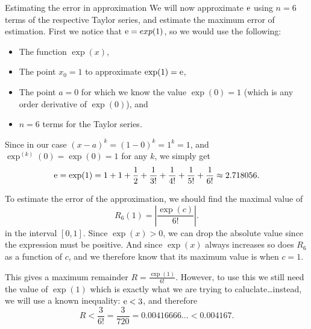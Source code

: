 \begin{example}{Estimating the error in approximation}{}
  We will now approximate $\mathrm{e}$ using $n=6$ terms of the respective Taylor series, and estimate the maximum error of estimation. First we notice that $\mathrm{e}=exp(1)$, so we would use the following:
  \begin{itemize}
    \item The function $\exp(x)$,
    \item The point $x_{0}=1$ to approximate $\exp(1)=\mathrm{e}$,
    \item The point $a=0$ for which we know the value $\exp(0)=1$ (which is any order derivative of $\exp(0)$), and
    \item $n=6$ terms for the Taylor series.
  \end{itemize}
  Since in our case $(x-a)^{k}=(1-0)^{k}=1^{k}=1$, and $\exp^{(k)}(0)=\exp(0)=1$ for any $k$, we simply get
  \[
    \mathrm{e} = \exp(1) = 1 + 1 + \frac{1}{2} + \frac{1}{3!} + \frac{1}{4!} + \frac{1}{5!} + \frac{1}{6!} \approx 2.718056.
  \]

  To estimate the error of the approximation, we should find the maximal value of
  \[
    R_{6}(1) = \left| \frac{\exp(c)}{6!} \right|.
  \]
  in the interval $[0,1]$. Since $\exp(x)>0$, we can drop the absolute value since the expression must be positive. And since $\exp(x)$ always increases so does $R_{6}$ as a function of $c$, and we therefore know that its maximum value is when $c=1$.

  This gives a maximum remainder $R = \frac{\exp(1)}{6!}$. However, to use this we still need the value of $\exp(1)$ which is exactly what we are trying to caluclate\dots instead, we will use a known inequality: $\mathrm{e}<3$, and therefore
  \[
    R<\frac{3}{6!}=\frac{3}{720}=0.00416666\dots<0.004167.
  \]
\end{example}


